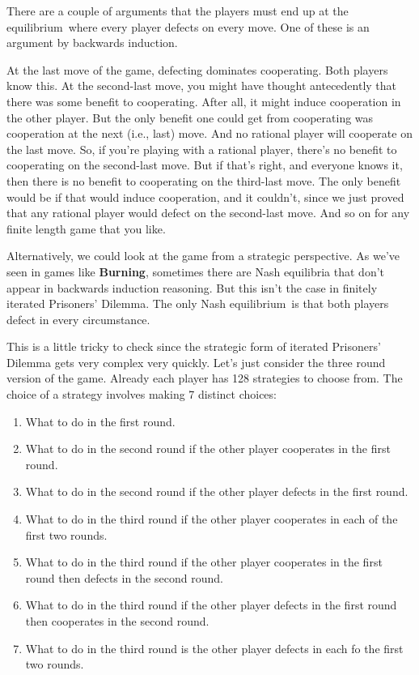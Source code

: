 \documentclass[
  11pt,
  letterpaper,
]{scrbook}
\providecommand{\tightlist}{%
  \setlength{\itemsep}{0pt}\setlength{\parskip}{0pt}}
\begin{document}
There are a couple of arguments that the players must end up at the
equilibrium~where every player defects on every move. One of these is an
argument by backwards induction.

At the last move of the game, defecting dominates cooperating. Both
players know this. At the second-last move, you might have thought
antecedently that there was some benefit to cooperating. After all, it
might induce cooperation in the other player. But the only benefit one
could get from cooperating was cooperation at the next (i.e., last)
move. And no rational player will cooperate on the last move. So, if
you're playing with a rational player, there's no benefit to cooperating
on the second-last move. But if that's right, and everyone knows it,
then there is no benefit to cooperating on the third-last move. The only
benefit would be if that would induce cooperation, and it couldn't,
since we just proved that any rational player would defect on the
second-last move. And so on for any finite length game that you like.

Alternatively, we could look at the game from a strategic perspective.
As we've seen in games like \textbf{Burning}, sometimes there are Nash
equilibria that don't appear in backwards induction reasoning. But this
isn't the case in finitely iterated Prisoners' Dilemma. The only Nash
equilibrium~is that both players defect in every circumstance.

This is a little tricky to check since the strategic form of iterated
Prisoners' Dilemma gets very complex very quickly. Let's just consider
the three round version of the game. Already each player has 128
strategies to choose from. The choice of a strategy involves making 7
distinct choices:

\begin{enumerate}
\def\labelenumi{\arabic{enumi}.}
\tightlist
\item
  What to do in the first round.
\item
  What to do in the second round if the other player cooperates in the
  first round.
\item
  What to do in the second round if the other player defects in the
  first round.
\item
  What to do in the third round if the other player cooperates in each
  of the first two rounds.
\item
  What to do in the third round if the other player cooperates in the
  first round then defects in the second round.
\item
  What to do in the third round if the other player defects in the first
  round then cooperates in the second round.
\item
  What to do in the third round is the other player defects in each fo
  the first two rounds.
\end{enumerate}
\end{document}
